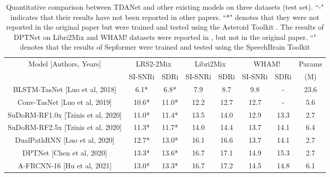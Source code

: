 \documentclass{article} \usepackage{iclr2023_conference,times}
\begin{document}
\begin{table}[ht]
\vspace{-1.0em}
\caption{Quantitative comparison between TDANet and other existing models on three datasets (test set). ``-" indicates that their results have not been reported in other papers. ``*" denotes that they were not reported in the original paper but were trained and tested using the Asteroid Toolkit \citep{Pariente2020Asteroid}. The results of DPTNet on Libri2Mix and WHAM! datasets were reported in \citep{yao2022stepwise}, but not in the original paper. ``" denotes that the results of Sepformer were trained and tested using the SpeechBrain Toolkit \citep{ravanelli2021speechbrain}}
\label{table:allmodel}
\footnotesize
\centering
\begin{tabular}{cccccccc}
\toprule
\multirow{2}{*}{Model [Authors, Years]} & \multicolumn{2}{c}{LRS2-2Mix} & \multicolumn{2}{c}{Libri2Mix} & \multicolumn{2}{c}{WHAM!} & Params  \\ \cmidrule(r){2-3} \cmidrule(r){4-5} \cmidrule(r){6-7}
                       & SI-SNRi        & SDRi         & SI-SNRi         & SDRi        & SI-SNRi       & SDRi      &       (M)                                    \\
\midrule
BLSTM-TasNet [Luo et al, 2018]        & 6.1*           & 6.8*         & 7.9             & 8.7         & 9.8           & -         & 23.6                                    \\
Conv-TasNet  [Luo et al, 2019]         & 10.6*          & 11.0*        & 12.2            & 12.7        & 12.7          & -         & 5.6                                   \\
SuDoRM-RF1.0x [Tzinis et al, 2020]        & 11.0*          & 11.4*        & 13.5            & 14.0        & 12.9          & 13.3      & 2.7                                  \\
SuDoRM-RF2.5x  [Tzinis et al, 2020]          & 11.3*          & 11.7*        & 14.0            & 14.4        & 13.7          & 14.1      & 6.4                            \\
DualPathRNN  [Luo et al, 2020]          & 12.7*          & 13.0*        & 16.1            & 16.6        & 13.7          & 14.1      & 2.7                              \\
DPTNet [Chen et al, 2020] & 13.3*         & 13.6*       & 16.7            & 17.1        & 14.9          & 15.3      & 2.7                           \\
A-FRCNN-16 [Hu et al, 2021]         & 13.0*          & 13.3*        & 16.7            & 17.2        & 14.5          & 14.8      & 6.1                                 \\

\end{tabular}
\end{table}
\end{document}

